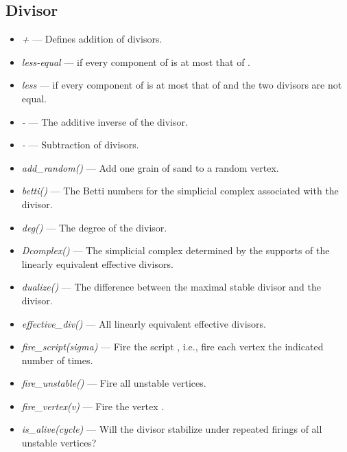\documentclass[letterpaper,10pt,english]{manual}
\begin{document}
\subsection{Divisor}
\begin{itemize}
\item {} 
\emph{+} --- Defines addition of divisors.

\item {} 
\emph{less-equal} ---  if every component of  is at most that of .

\item {} 
\emph{less} ---  if every component
of  is at most that of  and the two divisors are not
equal.

\item {} 
\emph{-} --- The additive inverse of the divisor.

\item {} 
\emph{-} --- Subtraction of divisors.

\item {} 
\emph{add\_random()} --- Add one grain of sand to a random vertex.

\item {} 
\emph{betti()} --- The Betti numbers for the simplicial complex
associated with the divisor.

\item {} 
\emph{deg()} --- The degree of the divisor.

\item {} 
\emph{Dcomplex()} --- The simplicial complex determined
by the supports of the linearly equivalent effective divisors.

\item {} 
\emph{dualize()} --- The difference between the maximal
stable divisor and the divisor.

\item {} 
\emph{effective\_div()} --- All linearly equivalent effective divisors.

\item {} 
\emph{fire\_script(sigma)} --- Fire the script , i.e., fire each vertex the indicated number of times.

\item {} 
\emph{fire\_unstable()} --- Fire all unstable vertices.

\item {} 
\emph{fire\_vertex(v)} --- Fire the vertex .

\item {} 
\emph{is\_alive(cycle)} --- Will the divisor stabilize under
repeated firings of all unstable vertices?


\end{itemize}
\end{document}
